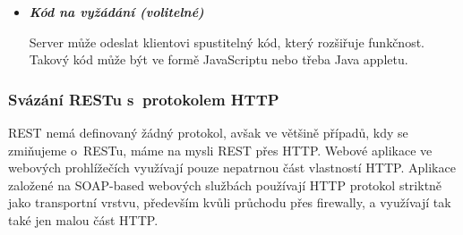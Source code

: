 \documentclass[11pt,twoside,a4paper]{book}
\begin{document}
\begin{itemize}
	\begin{itemize}
 	 \item \textit{HATEOAS (hypermedia as the engine of application state)} –
 	 klienti mohou přejít dynamicky do jiného stavu v~aplikaci přes hypermedia
 	 poslané serverem v~předchozí odpovědi. Jinými slovy, odpověď od serveru
 	 obsahuje hyperlinky\footnote{Adresa zdroje, na který je možno přejít}, na
 	 které může klient přejít, aby se dostal do jiného stavu v~aplikaci.
	  \item \textit{Adresovatelné zdroje} – každý zdroj
	  poskytující informace a data musí být jednoznačně identifikovaný svou
	  URI\footnote{Textový řetězec s~definovanou strukturou sloužící pro přesnou
	  specifikaci zdroje informací}.
		\item \textit{Manipulace se zdrojem a jejich reprezentacemi} – pokud se klient
		nachází na určitém zdroji, může s~ním provádět operace modifikace či smazání.
		\item \textit{Orientace na reprezentaci} – u~jedné
		URI lze nastavit, aby dokázala použít odlišné formáty dat, protože ne všechny platformy užívají stejný formát. Například webový
prohlížeč používá HTML a JavaScript, který potřebuje JSON. Java aplikace může
vyžadovat XML.
\end{itemize}

\item\textbf{\textit{Kód na vyžádání (volitelné)}}

Server může odeslat klientovi spustitelný kód, který rozšiřuje funkčnost.
Takový kód může být ve formě JavaScriptu nebo třeba Java appletu.
\end{itemize}

\subsubsection{Svázání RESTu s~protokolem HTTP}

REST nemá definovaný žádný protokol, avšak ve většině případů, kdy se zmiňujeme
o~RESTu, máme na mysli REST přes HTTP. Webové aplikace ve webových prohlížečích 
využívají pouze nepatrnou část vlastností HTTP. Aplikace založené na SOAP-based
webových službách používají HTTP protokol striktně jako transportní vrstvu,
především kvůli průchodu přes firewally, a využívají tak také jen malou část
HTTP.
\end{document}
